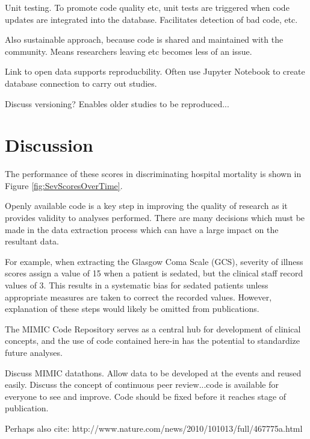 \documentclass{bioinfo}
\begin{document}
\begin{methods}
Unit testing. To promote code quality etc, unit tests are triggered when code updates are integrated into the database. Facilitates detection of bad code, etc.

Also sustainable approach, because code is shared and maintained with the community. Means researchers leaving etc becomes less of an issue.

Link to open data supports reproducbility. Often use Jupyter Notebook to create database connection to carry out studies.

Discuss versioning? Enables older studies to be reproduced...

\end{methods}


\section{Discussion}

The performance of these scores in discriminating hospital mortality is shown in Figure \ref{fig:SevScoresOverTime}.

Openly available code is a key step in improving the quality of research as it provides validity to analyses performed. There are many decisions which must be made in the data extraction process which can have a large impact on the resultant data. 

For example, when extracting the Glasgow Coma Scale (GCS), severity of illness scores assign a value of 15 when a patient is sedated, but the clinical staff record values of 3. This results in a systematic bias for sedated patients unless appropriate measures are taken to correct the recorded values. However, explanation of these steps would likely be omitted from publications. 

The MIMIC Code Repository serves as a central hub for development of clinical concepts, and the use of code contained here-in has the potential to standardize future analyses.

Discuss MIMIC datathons. Allow data to be developed at the events and reused easily. Discuss the concept of continuous peer review...code is available for everyone to see and improve. Code should be fixed before it reaches stage of publication.

Perhaps also cite: http://www.nature.com/news/2010/101013/full/467775a.html
\end{document}
